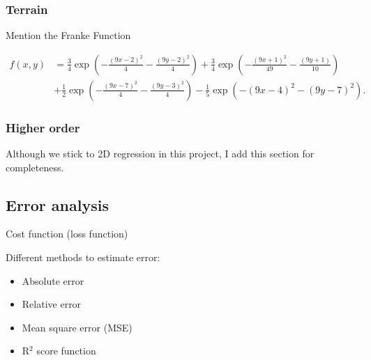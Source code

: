 \subsubsection{Terrain} \label{sec:terrain}
Mention the Franke Function 

\begin{align*}
f(x,y) &= \frac{3}{4}\exp{\left(-\frac{(9x-2)^2}{4} - \frac{(9y-2)^2}{4}\right)}+\frac{3}{4}\exp{\left(-\frac{(9x+1)^2}{49}- \frac{(9y+1)}{10}\right)} \\
&+\frac{1}{2}\exp{\left(-\frac{(9x-7)^2}{4} - \frac{(9y-3)^2}{4}\right)} -\frac{1}{5}\exp{\left(-(9x-4)^2 - (9y-7)^2\right) }.
\end{align*}


\subsubsection{Higher order}
Although we stick to 2D regression in this project, I add this section for completeness. 


\subsection{Error analysis}

Cost function (loss function) 

Different methods to estimate error:
\begin{itemize}
\item{Absolute error}
\item{Relative error}
\item{Mean square error (MSE)}
\item{R$^2$ score function}
\end{itemize}

